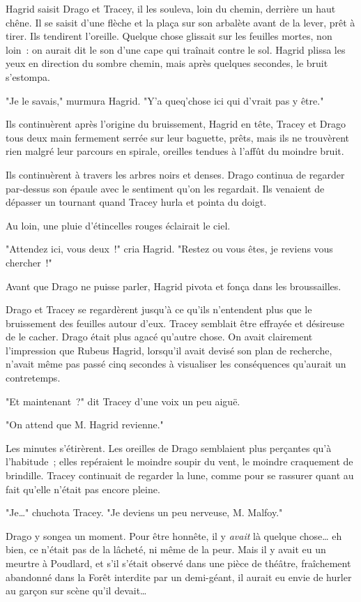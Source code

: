 Hagrid saisit Drago et Tracey, il les souleva, loin du chemin, derrière un haut chêne. Il se saisit d'une flèche et la plaça sur son arbalète avant de la lever, prêt à tirer. Ils tendirent l'oreille. Quelque chose glissait sur les feuilles mortes, non loin~: on aurait dit le son d'une cape qui traînait contre le sol. Hagrid plissa les yeux en direction du sombre chemin, mais après quelques secondes, le bruit s'estompa.

"Je le savais," murmura Hagrid. "Y'a queq'chose ici qui d'vrait pas y être."

Ils continuèrent après l'origine du bruissement, Hagrid en tête, Tracey et Drago tous deux main fermement serrée sur leur baguette, prêts, mais ils ne trouvèrent rien malgré leur parcours en spirale, oreilles tendues à l'affût du moindre bruit.

Ils continuèrent à travers les arbres noirs et denses. Drago continua de regarder par-dessus son épaule avec le sentiment qu'on les regardait. Ils venaient de dépasser un tournant quand Tracey hurla et pointa du doigt.

Au loin, une pluie d'étincelles rouges éclairait le ciel.

"Attendez ici, vous deux~!" cria Hagrid. "Restez ou vous êtes, je reviens vous chercher~!"

Avant que Drago ne puisse parler, Hagrid pivota et fonça dans les broussailles.

Drago et Tracey se regardèrent jusqu'à ce qu'ils n'entendent plus que le bruissement des feuilles autour d'eux. Tracey semblait être effrayée et désireuse de le cacher. Drago était plus agacé qu'autre chose. On avait clairement l'impression que Rubeus Hagrid, lorsqu'il avait devisé son plan de recherche, n'avait même pas passé cinq secondes à visualiser les conséquences qu'aurait un contretemps.

"Et maintenant~?" dit Tracey d'une voix un peu aiguë.

"On attend que M. Hagrid revienne."

Les minutes s'étirèrent. Les oreilles de Drago semblaient plus perçantes qu'à l'habitude~; elles repéraient le moindre soupir du vent, le moindre craquement de brindille. Tracey continuait de regarder la lune, comme pour se rassurer quant au fait qu'elle n'était pas encore pleine.

"Je…" chuchota Tracey. "Je deviens un peu nerveuse, M. Malfoy."

Drago y songea un moment. Pour être honnête, il y \emph{avait} là quelque chose… eh bien, ce n'était pas de la lâcheté, ni même de la peur. Mais il y avait eu un meurtre à Poudlard, et s'il s'était observé dans une pièce de théâtre, fraîchement abandonné dans la Forêt interdite par un demi-géant, il aurait eu envie de hurler au garçon sur scène qu'il devait…

